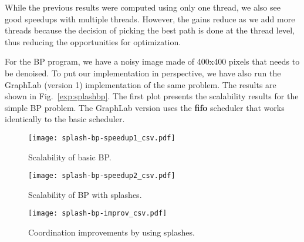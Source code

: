 \begin{table*}[ht]

\begin{center}
\end{center}
     \caption{Summarized information about the datasets used in the SSSP program.}
     \label{tbl:shortest_path_speedup}
\end{table*}

While the previous results were computed using only one thread, we also see good speedups with multiple threads. However, the gains reduce as we add
more threads because the decision of picking the best path is done at the thread level, thus reducing the opportunities for optimization.

For the BP program, we have a noisy image made of 400x400 pixels that needs to be denoised.
To put our implementation in perspective, we have also run the GraphLab (version 1) implementation of the same problem. The results are shown
in Fig.~\ref{exp:splashbp}. The first plot presents the scalability results for the simple BP problem. The GraphLab version
uses the \textbf{fifo} scheduler that works identically to the basic \lang scheduler.

\begin{figure*}[ht]
   \centering
   \begin{subfigure}[b]{0.3\textwidth}
      \texttt{[image: splash-bp-speedup1\_csv.pdf]}
      \caption{Scalability of basic BP.}
   \end{subfigure}
   \begin{subfigure}[b]{0.3\textwidth}
      \texttt{[image: splash-bp-speedup2\_csv.pdf]}
      \caption{Scalability of BP with splashes.}
   \end{subfigure}
   \begin{subfigure}[b]{0.3\textwidth}
      \texttt{[image: splash-bp-improv\_csv.pdf]}
      \caption{Coordination improvements by using splashes.}
   \end{subfigure}
   \caption{Experimental results for BP with coordination using splashes. The dataset is a 400x400 image.}
   \label{exp:splashbp}
\end{figure*}

